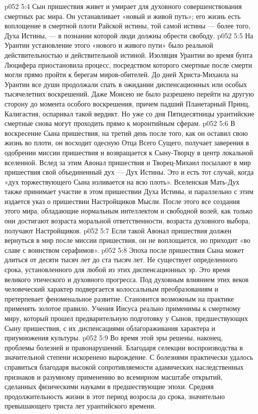\vs p052 5:4 Сын пришествия живет и умирает для духовного совершенствования смертных рас мира. Он устанавливает «новый и живой путь»; его жизнь есть воплощение в смертной плоти Райской истины, той самой истины --- более того, Духа Истины, --- в познании которой люди должны обрести свободу.
\vs p052 5:5 На Урантии установление этого «нового и живого пути» было реальной действительностью и действительной истиной. Изоляция Урантии во время бунта Люцифера приостановила процесс, посредством которого смертные после смерти могли прямо пройти к берегам миров\hyp{}обителей. До дней Христа\hyp{}Михаила на Урантии все души продолжали спать в ожидании диспенсационных или особых тысячелетних воскрешений. Даже Моисею не было разрешено перейти на другую сторону до момента особого воскрешения, причем падший Планетарный Принц, Калигастия, оспаривал такой вердикт. Но уже со дня Пятидесятницы урантийские смертные снова могут проходить прямо к моронтийным сферам.
\vs p052 5:6 \pc В воскресение Сына пришествия, на третий день после того, как он оставил свою жизнь во плоти, он восходит одесную Отца Всего Сущего, получает заверения в одобрении миссии пришествия и возвращается к Сыну\hyp{}Творцу в центр локальной вселенной. Вслед за этим Авонал пришествия и Творец\hyp{}Михаил посылают в мир пришествия свой объединенный дух --- Дух Истины. Это и есть тот случай, когда «дух торжествующего Сына изливается на всю плоть». Вселенская Мать\hyp{}Дух также принимает участие в этом пришествии Духа Истины, и параллельно с этим издается указ о пришествии Настройщиков Мысли. После этого все создания этого мира, обладающие нормальным интеллектом и свободной волей, как только они достигают возраста моральной ответственности, возраста духовного выбора, получают Настройщиков.
\vs p052 5:7 Если такой Авонал пришествия должен вернуться в мир после миссии пришествия, он не воплощается, но приходит «во славе с воинством серафимов».
\vs p052 5:8 \pc Эпоха после пришествия Сына может длиться от десяти тысяч лет до ста тысяч лет. Не существует определенного срока, установленного для любой из этих диспенсационных эр. Это время великого этического и духовного прогресса. Под духовным влиянием этих веков человеческий характер подвергается колоссальным преобразованиям и претерпевает феноменальное развитие. Становится возможным на практике применять золотое правило. Учения Иисуса реально применимы к смертному миру, который прошел предварительную подготовку у Сынов, предшествующих Сыну пришествия, с их диспенсациями облагораживания характера и приумножения культуры.
\vs p052 5:9 Во время этой эры решены, наконец, проблемы болезней и правонарушений. Благодаря селекции воспроизводства в значительной степени искоренено вырождение. С болезнями практически удалось справиться благодаря высокой сопротивляемости адамических наследственных признаков и разумному применению во всемирном масштабе открытий, сделанных физическими науками в предшествующие эпохи. Средняя продолжительность жизни в этот период возросла до срока, значительно превышающего триста лет урантийского времени.
